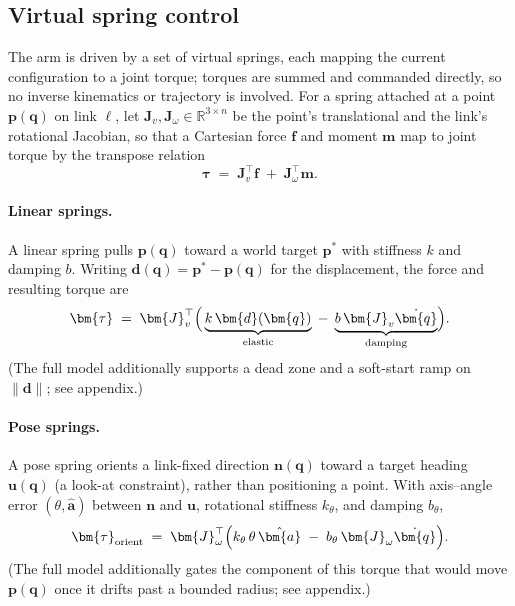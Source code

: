 %

\subsection{Virtual spring control}
\label{sec:spring-math-summary}

The arm is driven by a set of virtual springs, each mapping the current
configuration to a joint torque; torques are summed and commanded directly, so
no inverse kinematics or trajectory is involved. For a spring attached at a
point $\bm{p}(\bm{q})$ on link $\ell$, let $\bm{J}_{v}, \bm{J}_{\omega} \in
\mathbb{R}^{3\times n}$ be the point's translational and the link's rotational
Jacobian, so that a Cartesian force $\bm{f}$ and moment $\bm{m}$ map to joint
torque by the transpose relation
%
\begin{equation}
  \bm{\tau} \;=\; \bm{J}_{v}^{\top}\bm{f} \;+\; \bm{J}_{\omega}^{\top}\bm{m}.
  \label{eq:summary-transpose}
\end{equation}

\paragraph{Linear springs.} A linear spring pulls $\bm{p}(\bm{q})$ toward a
world target $\bm{p}^{*}$ with stiffness $k$ and damping $b$. Writing
$\bm{d}(\bm{q}) = \bm{p}^{*} - \bm{p}(\bm{q})$ for the displacement, the force
and resulting torque are
%
\begin{equation}
  \bm{\tau} \;=\; \bm{J}_{v}^{\top}\Bigl(\,\underbrace{k\,\bm{d}(\bm{q})}_{\text{elastic}}
  \;-\; \underbrace{b\,\bm{J}_{v}\dot{\bm{q}}}_{\text{damping}}\Bigr).
  \label{eq:summary-linear}
\end{equation}
%
(The full model additionally supports a dead zone and a soft-start ramp on
$\lVert\bm{d}\rVert$; see appendix.)

\paragraph{Pose springs.} A pose spring orients a link-fixed direction
$\bm{n}(\bm{q})$ toward a target heading $\bm{u}(\bm{q})$ (a look-at
constraint), rather than positioning a point. With axis--angle error
$(\theta, \hat{\bm{a}})$ between $\bm{n}$ and $\bm{u}$, rotational stiffness
$k_{\theta}$, and damping $b_{\theta}$,
%
\begin{equation}
  \bm{\tau}_{\mathrm{orient}} \;=\; \bm{J}_{\omega}^{\top}
  \Bigl(k_{\theta}\,\theta\,\hat{\bm{a}} \;-\; b_{\theta}\,\bm{J}_{\omega}\dot{\bm{q}}\Bigr).
  \label{eq:summary-pose}
\end{equation}
%
(The full model additionally gates the component of this torque that would
move $\bm{p}(\bm{q})$ once it drifts past a bounded radius; see appendix.)

